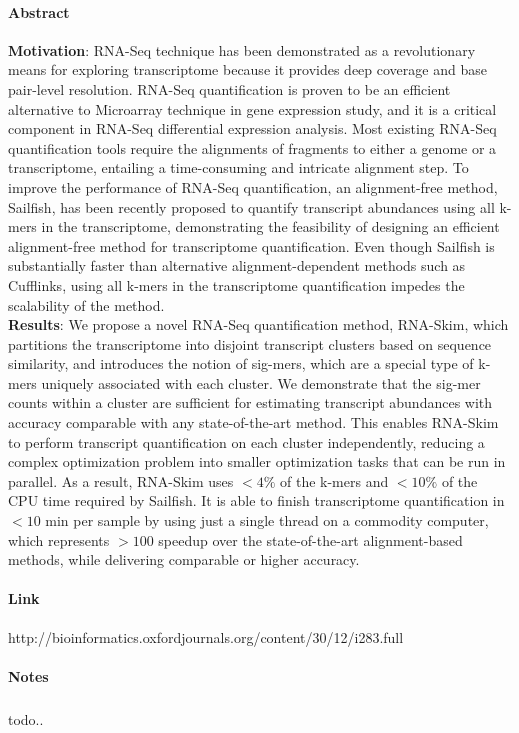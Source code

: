 \documentclass{article}
\begin{document}
		\paragraph{Abstract\\} \textbf{Motivation}: RNA-Seq technique has been demonstrated as a revolutionary means for exploring transcriptome because it provides deep coverage and base pair-level resolution. RNA-Seq quantification is proven to be an efficient alternative to Microarray technique in gene expression study, and it is a critical component in RNA-Seq differential expression analysis. Most existing RNA-Seq quantification tools require the alignments of fragments to either a genome or a transcriptome, entailing a time-consuming and intricate alignment step. To improve the performance of RNA-Seq quantification, an alignment-free method, Sailfish, has been recently proposed to quantify transcript abundances using all k-mers in the transcriptome, demonstrating the feasibility of designing an efficient alignment-free method	for transcriptome quantification. Even though Sailfish is substantially	faster than alternative alignment-dependent methods such as Cufflinks, using all k-mers in the transcriptome quantification impedes the scalability of the method.\\	\textbf{Results}: We propose a novel RNA-Seq quantification method, RNA-Skim, which partitions the transcriptome into disjoint transcript clusters based on sequence similarity, and introduces the notion of sig-mers, which are a special type of k-mers uniquely associated with each cluster. We demonstrate that the sig-mer counts within a cluster are sufficient for estimating transcript abundances with accuracy comparable with any state-of-the-art method. This enables RNA-Skim to perform transcript quantification on each cluster independently, reducing a complex optimization problem into smaller optimization tasks that can be run in parallel. As a result, RNA-Skim uses $<4\%$ of the k-mers and $<10\%$ of the CPU time required by Sailfish. It is able to finish transcriptome quantification in $<10$ min per sample by using just a single thread on a commodity computer, which represents $>100$ speedup over the state-of-the-art alignment-based methods, while delivering comparable or higher accuracy.
		\paragraph{Link\\} http://bioinformatics.oxfordjournals.org/content/30/12/i283.full
		\paragraph{Notes}
		\subparagraph{} todo..
\end{document}
